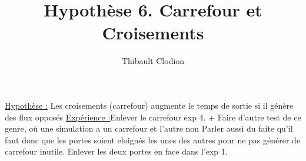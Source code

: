 \documentclass[12pt]{article}
\title{Hypothèse 6. Carrefour et Croisements}
\author{Thibault Clodion}
\begin{document}
\maketitle %

\underline{Hypothèse :} Les croisements (carrefour) augmente le temps de sortie si il génère des flux opposés
\newline\newline
\underline{Expérience :}Enlever le carrefour exp 4. + Faire d'autre test de ce genre, où une simulation a un carrefour et l'autre non
\newline
Parler aussi du faite qu'il faut donc que les portes soient eloignés les unes des autres pour ne pas générer de carrefour inutile.
\newline
Enlever les deux portes en face dans l'exp 1.
\newline\newline
\end{document}
